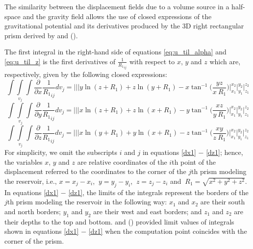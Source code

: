 \documentclass[journal abbreviation, manuscript]{copernicus}
\begin{document}
The similarity between the displacement fields due to a volume source in a half-space and the gravity field allows the use of closed expressions of the gravitational potential and its derivatives produced by the 3D right rectangular prism derived by \cite{Nagyetal2000} and (\citeyear{Nagyetal2002}).  

The first integral in the right-hand side of equations  \ref{eq:u_til_alpha} and \ref{eq:u_til_z}  is the first derivatives of ${\frac{1}{{R_1}_{ij}}}$ with respect to $x$, $y$ and $z$ which are, respectively, given by the following closed expressions: 
\begin{equation}
\int\int\limits_{v_j}\int  \frac{\partial }{\partial x} {\frac{1}{{R_1}_{ij}}} dv_j =
\Bigg|\Bigg|\Bigg| 
y \ln(z + {R_1}) + z \ln(y + {R_1}) -  x  \tan^{-1} \Bigg( \frac{yz}{x \:{R_1}} \Bigg) 
\Bigg|_{x_1}^{x_2} \Bigg|_{y_1}^{y_2} \Bigg|_{z_1}^{z_2}
\label{dx1}
\end{equation}
\begin{equation}
\int\int\limits_{v_j}\int  \frac{\partial }{\partial y} {\frac{1}{{R_1}_{ij}}} dv_j =
\Bigg|\Bigg|\Bigg|
x \ln(z + {R_1}) + z \ln(x + {R_1}) -  y  \tan^{-1} \Bigg( \frac{xz}{y \:{R_1}} 
\Bigg)
\Bigg|_{x_1}^{x_2} \Bigg|_{y_1}^{y_2} \Bigg|_{z_1}^{z_2}
\label{dy1}
\end{equation}
\begin{equation}
\int\int\limits_{v_j}\int  \frac{\partial }{\partial z} {\frac{1}{{R_1}_{ij}}} dv_j =
\Bigg|\Bigg|\Bigg|
x \ln(y + {R_1}) + y \ln(x + {R_1}) -  z  \tan^{-1} \Bigg( \frac{xy}{z \:{R_1}} \Bigg) 
\Bigg|_{x_1}^{x_2} \Bigg|_{y_1}^{y_2} \Bigg|_{z_1}^{z_2}
\label{dz1}
\end{equation}
For simplicity,  we omit the subscripts $i$ and $j$ in equations \ref{dx1} $-$ \ref{dz1}; hence, the variables $x$, $y$ and $z$  are relative coordinates of the $i$th point of the displacement referred to the coordinates to the corner of the $j$th prism modeling the reservoir, i.e.,  $x = x_j - x_i $, $\: y = y_j - y_i $, $\: z = z_j - z_i $ and 
$\: {R_1} = \sqrt{x^{2} + y^{2} + z^{2}}$.
In equations \ref{dx1} $-$ \ref{dz1}, the limits of the integrals represent the borders of the $j$th prism modeling the reservoir in the following way: $x_1$ and $x_2$ are their south and north borders; $y_1$ and  $y_2$ are their  west and east borders;  and 
$z_1$ and $z_2$ are their depths to the top and bottom.
\cite{Nagyetal2000} and (\citeyear{Nagyetal2002}) provided limit values of integrals shown in equations \ref{dx1} $-$ \ref{dz1} when the computation point coincides with the corner of the prism.
\end{document}
